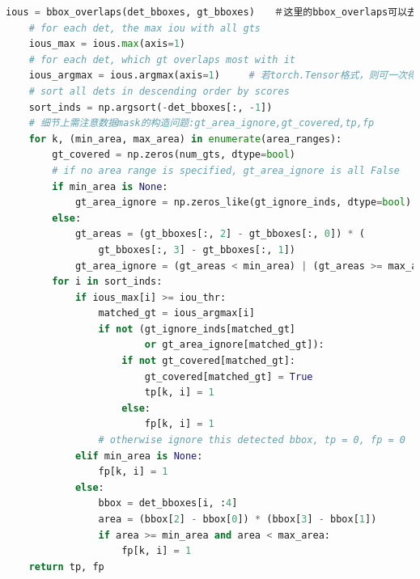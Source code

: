 \documentclass[UTF8]{ctexart}
\begin{document}
\begin{lstlisting}[language=Python]
    ious = bbox_overlaps(det_bboxes, gt_bboxes)　　＃这里的bbox_overlaps可以去掉循环
    # for each det, the max iou with all gts
    ious_max = ious.max(axis=1)
    # for each det, which gt overlaps most with it
    ious_argmax = ious.argmax(axis=1)　　　# 若torch.Tensor格式，则可一次得到value, idx
    # sort all dets in descending order by scores
    sort_inds = np.argsort(-det_bboxes[:, -1])
    # 细节上需注意数据mask的构造问题:gt_area_ignore,gt_covered,tp,fp
    for k, (min_area, max_area) in enumerate(area_ranges):
        gt_covered = np.zeros(num_gts, dtype=bool)
        # if no area range is specified, gt_area_ignore is all False
        if min_area is None:
            gt_area_ignore = np.zeros_like(gt_ignore_inds, dtype=bool)
        else:
            gt_areas = (gt_bboxes[:, 2] - gt_bboxes[:, 0]) * (
                gt_bboxes[:, 3] - gt_bboxes[:, 1])
            gt_area_ignore = (gt_areas < min_area) | (gt_areas >= max_area)
        for i in sort_inds:
            if ious_max[i] >= iou_thr:
                matched_gt = ious_argmax[i]
                if not (gt_ignore_inds[matched_gt]
                        or gt_area_ignore[matched_gt]):
                    if not gt_covered[matched_gt]:
                        gt_covered[matched_gt] = True
                        tp[k, i] = 1
                    else:
                        fp[k, i] = 1
                # otherwise ignore this detected bbox, tp = 0, fp = 0　　＃　细节
            elif min_area is None:
                fp[k, i] = 1
            else:
                bbox = det_bboxes[i, :4]
                area = (bbox[2] - bbox[0]) * (bbox[3] - bbox[1])
                if area >= min_area and area < max_area:
                    fp[k, i] = 1
    return tp, fp
\end{lstlisting}
\end{document}
